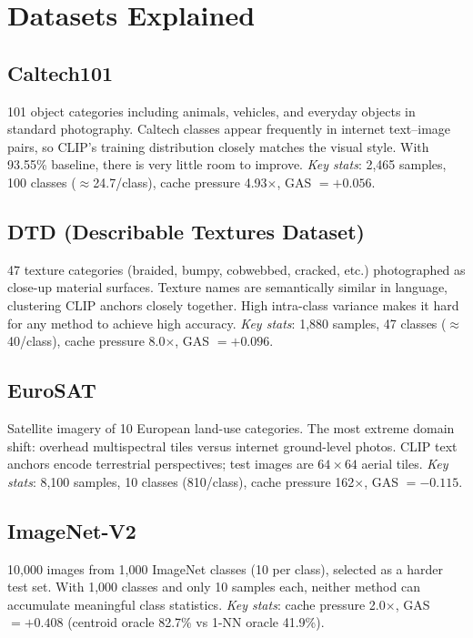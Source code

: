 \documentclass[12pt,a4paper]{article}
\newcommand{\1}{\mathbf{1}}
\begin{document}
\section{Datasets Explained}

\subsection{Caltech101}
101 object categories including animals, vehicles, and everyday objects in standard photography.
Caltech classes appear frequently in internet text--image pairs, so CLIP's training distribution closely matches the visual style.
With 93.55\% baseline, there is very little room to improve.
\textit{Key stats}: 2,465 samples, 100 classes ($\approx$24.7/class), cache pressure 4.93$\times$, GAS $=+0.056$.

\subsection{DTD (Describable Textures Dataset)}
47 texture categories (braided, bumpy, cobwebbed, cracked, etc.) photographed as close-up material surfaces.
Texture names are semantically similar in language, clustering CLIP anchors closely together.
High intra-class variance makes it hard for any method to achieve high accuracy.
\textit{Key stats}: 1,880 samples, 47 classes ($\approx$40/class), cache pressure 8.0$\times$, GAS $=+0.096$.

\subsection{EuroSAT}
Satellite imagery of 10 European land-use categories.
The most extreme domain shift: overhead multispectral tiles versus internet ground-level photos.
CLIP text anchors encode terrestrial perspectives; test images are $64\times64$ aerial tiles.
\textit{Key stats}: 8,100 samples, 10 classes (810/class), cache pressure 162$\times$, GAS $=-0.115$.

\subsection{ImageNet-V2}
10,000 images from 1,000 ImageNet classes (10 per class), selected as a harder test set.
With 1,000 classes and only 10 samples each, neither method can accumulate meaningful class statistics.
\textit{Key stats}: cache pressure 2.0$\times$, GAS $=+0.408$ (centroid oracle 82.7\% vs 1-NN oracle 41.9\%).
\end{document}
